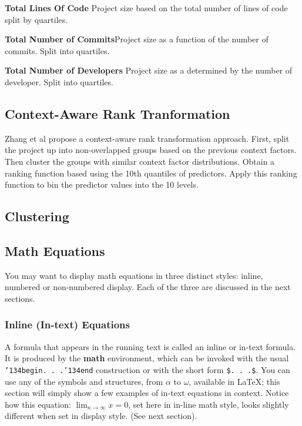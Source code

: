 \documentclass{sig-alternate-05-2015}
\begin{document}
\textbf{Total Lines Of Code} Project size based on the total number of lines of code split by quartiles.

\textbf{Total Number of Commits}Project size as a function of the number of commits. Split into quartiles.

\textbf{Total Number of Developers} Project size as a determined by the number of developer. Split into quartiles.

\subsection{Context-Aware Rank Tranformation}
Zhang et al \cite{Zhang:2014:TBU:2597073.2597078} propose a context-aware rank transformation approach. First, split the project up into non-overlapped groups based on the previous context factors. Then cluster the groups with similar context factor distributions. Obtain a ranking function based using the 10th quantiles of predictors. Apply this ranking function to bin the predictor values into the 10 levels.

\subsection{Clustering}



\subsection{Math Equations}
You may want to display math equations in three distinct styles:
inline, numbered or non-numbered display.  Each of
the three are discussed in the next sections.

\subsubsection{Inline (In-text) Equations}
A formula that appears in the running text is called an
inline or in-text formula.  It is produced by the
\textbf{math} environment, which can be
invoked with the usual \texttt{{\char'134}begin. . .{\char'134}end}
construction or with the short form \texttt{\$. . .\$}. You
can use any of the symbols and structures,
from $\alpha$ to $\omega$, available in
\LaTeX\cite{Lamport:LaTeX}; this section will simply show a
few examples of in-text equations in context. Notice how
this equation: \begin{math}\lim_{n\rightarrow \infty}x=0\end{math},
set here in in-line math style, looks slightly different when
set in display style.  (See next section).
\end{document}
